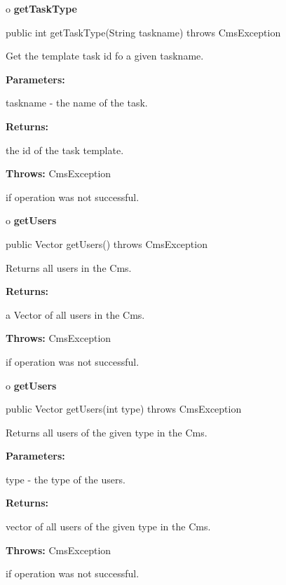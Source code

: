 o {\bf getTaskType} 

\begin{PRE}
 public int getTaskType(String taskname) throws CmsException
\end{PRE}

\begin{description}
\htmlDD Get the template task id fo a given taskname. 

\begin{description}
\item {\bf Parameters:}  

taskname - the name of the task.  
\item {\bf Returns:}  

the id of the task template.  
\item {\bf Throws:} CmsException  

if operation was not successful.  
\end{description}

\end{description}

o {\bf getUsers} 

\begin{PRE}
 public Vector getUsers() throws CmsException
\end{PRE}

\begin{description}
\htmlDD Returns all users in the Cms. 

\begin{description}
\item {\bf Returns:}  

a Vector of all users in the Cms.  
\item {\bf Throws:} CmsException  

if operation was not successful.  
\end{description}

\end{description}

o {\bf getUsers} 

\begin{PRE}
 public Vector getUsers(int type) throws CmsException
\end{PRE}

\begin{description}
\htmlDD Returns all users of the given type in the Cms. 

\begin{description}
\item {\bf Parameters:}  

type - the type of the users.  
\item {\bf Returns:}  

vector of all users of the given type in the Cms.  
\item {\bf Throws:} CmsException  

if operation was not successful.  
\end{description}

\end{description}

